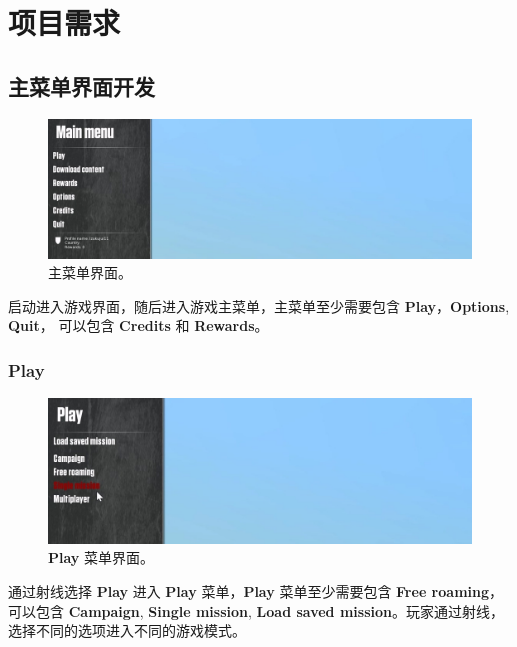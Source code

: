 \documentclass[letterpaper,10pt]{article}
\begin{document}
		\section{项目需求}
	
			\subsection{主菜单界面开发}
	
			\begin{figure}[htbp]
				\centering 
				\includegraphics[width=0.7\columnwidth]{picture/Main menu}
				\caption{
					\label{fig: Main menu} 
					主菜单界面。
				}
			\end{figure}
			
			启动进入游戏界面，随后进入游戏主菜单，主菜单至少需要包含 \textbf{Play}，\textbf{Options}, \textbf{Quit}， 可以包含 \textbf{Credits} 和 \textbf{Rewards}。
			
				\subsubsection{Play}
				
				\begin{figure}[htbp]
					\centering 
					\includegraphics[width=0.7\columnwidth]{picture/Play}
					\caption{
						\label{fig: Play} 
						\textbf{Play} 菜单界面。
					}
				\end{figure}
				
				通过射线选择 \textbf{Play} 进入 \textbf{Play} 菜单，\textbf{Play} 菜单至少需要包含 \textbf{Free roaming}， 可以包含 \textbf{Campaign}, \textbf{Single mission}, \textbf{Load saved mission}。玩家通过射线，选择不同的选项进入不同的游戏模式。
				
\end{document}
